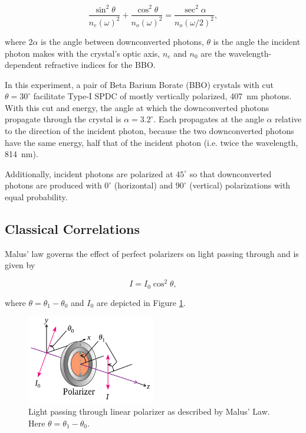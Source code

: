 \documentclass{article}
\begin{document}
\begin{equation}
  \frac{\sin^2{\theta}}{n_e(\omega)^2} + \frac{\cos^2{\theta}}{n_o(\omega)^2} = \frac{\sec^2{\alpha}}{n_o(\omega/2)^2}, \label{eq:dc}
\end{equation}

where $2 \alpha$ is the angle between downconverted photons, $\theta$ is the angle the incident photon makes with the crystal's optic axis, $n_e$ and $n_0$ are the wavelength-dependent refractive indices for the BBO.

In this experiment, a pair of Beta Barium Borate (BBO) crystals with cut $\theta=30^{\circ}$ facilitate Type-I SPDC of mostly vertically polarized, 407~nm photons. With this cut and energy, the angle at which the downconverted photons propagate through the crystal is $\alpha = 3.2^{\circ}$. Each propagates at the angle $\alpha$ relative to the direction of the incident photon, because the two downconverted photons have the same energy, half that of the incident photon (i.e. twice the wavelength, 814~nm).

Additionally, incident photons are polarized at $45^{\circ}$ so that downconverted photons are produced with $0^{\circ}$ (horizontal) and $90^{\circ}$ (vertical) polarizations with equal probability.

\subsection{Classical Correlations}

Malus' law governs the effect of perfect polarizers on light passing through and is given by

\begin{equation}
  I = I_0 \cos^2{\theta},
\end{equation}

where $\theta = \theta_1 - \theta_0$ and $I_0$ are depicted in Figure \ref{fig:malus}.

\begin{figure}[!h]
  \centering
  \includegraphics[width=0.5\textwidth]{malus}
  \caption{Light passing through linear polarizer as described by Malus' Law. Here $\theta = \theta_1 - \theta_0$. \label{fig:malus}}
\end{figure}
\end{document}
